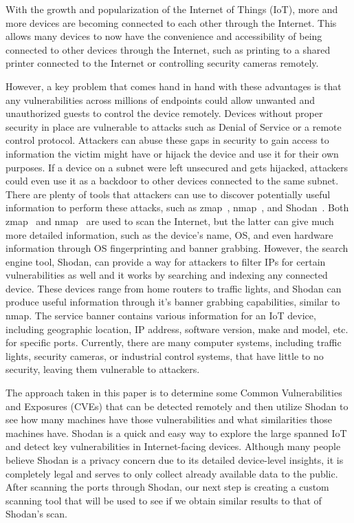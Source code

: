 With the growth and popularization of the Internet of Things (IoT),
more and more devices are becoming connected to each other through the Internet. 
This allows many devices to now have the convenience and accessibility of being 
connected to other devices through the Internet, such as printing to a
shared printer connected to the Internet or controlling security cameras
remotely.

However, a key problem that comes hand in hand with these advantages is that
any vulnerabilities across millions of endpoints could allow unwanted and
unauthorized guests to control the device remotely. Devices without proper
security in place are vulnerable to attacks such as Denial of Service or a remote
control protocol. Attackers can abuse these gaps in security to gain access to
information the victim might have or hijack the device and use it for their own
purposes. If a device on a subnet were left unsecured and gets hijacked, attackers
could even use it as a backdoor to other devices connected to the same subnet.
There are plenty of tools that attackers can use to discover potentially useful
information to perform these attacks, such as zmap~\cite{zmap}, nmap~\cite{nmap},
and Shodan~\cite{shodan}.
Both zmap~\cite{zmap} and nmap~\cite{nmap} are used to scan the Internet, but the
latter can give much more detailed information, such as the device's name, OS, 
and even hardware information through OS fingerprinting and banner grabbing. 
However, the search engine tool, Shodan, can
provide a way for attackers to filter IPs for certain vulnerabilities as well and
it works by searching and indexing any connected device. These devices range from home routers
to traffic lights, and Shodan can produce useful information through it's banner
grabbing capabilities, similar to nmap. The service banner
contains various information for an IoT device, including geographic location, 
IP address, software version, make and model, etc. for specific ports. 
Currently, there are many computer systems, including traffic lights, security cameras,
or industrial control systems, that have little to no security, leaving
them vulnerable to attackers\cite{afit//CSAR-10-025-01}.

The approach taken in this paper is to determine some Common Vulnerabilities
and Exposures (CVEs) that can be detected remotely and then utilize Shodan
to see how many machines have those vulnerabilities and what similarities
those machines have. Shodan is a quick and easy way to explore the large
spanned IoT and detect key vulnerabilities in Internet-facing devices.
Although many people believe Shodan is a privacy concern due to its detailed
device-level insights, it is completely legal and serves to only collect
already available data to the public. After scanning the ports through Shodan,
our next step is creating a custom scanning tool that will be used to see if we obtain
similar results to that of Shodan's scan. 

